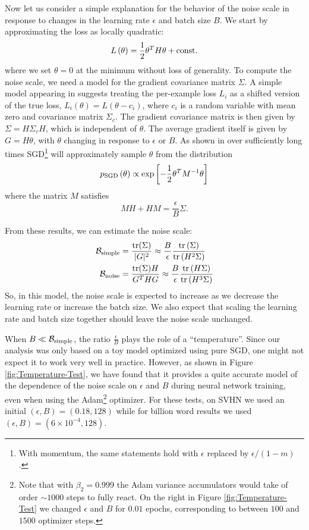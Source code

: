 \documentclass[english]{article}
\newcommand{\CB}{{\cal B}}
\begin{document}
Now let us consider a simple  explanation for the behavior of the noise scale in response to changes in the learning rate $\epsilon$ and batch size $B$.  %
We start by approximating the loss as locally quadratic:
\[
L\left(\theta\right)=\frac{1}{2}\theta^{T}H\theta+{\rm const.}
\]
where we set $\theta=0$ at the minimum without loss of generality. To compute the noise scale, we need a model for the gradient covariance matrix $\Sigma$. A simple model appearing in \cite{conf/icml/SchaulZL13} suggests treating the per-example loss $L_{i}$ as a shifted version of the true loss, $L_{i}\left(\theta\right)=L\left(\theta-c_{i}\right)$, where $c_{i}$ is a random variable with mean zero and covariance matrix $\Sigma_{c}$. The gradient covariance matrix is then given by $\Sigma=H\Sigma_{c}H$, which is independent of $\theta$. The average gradient itself is given by $G=H\theta$, with $\theta$ changing in response to $\epsilon$ or $B$. As shown in \cite{1704.04289} over sufficiently long times SGD\footnote{With momentum, the same statements hold with $\epsilon$ replaced by $\epsilon/\left(1-m\right)$.} will approximately sample $\theta$ from the distribution
\[
p_{{\rm SGD}}\left(\theta\right)\propto\exp\left[-\frac{1}{2}\theta^{T}M^{-1}\theta\right]
\]
where the matrix $M$ satisfies
\[
MH+HM=\frac{\epsilon}{B}\Sigma.
\]


From these results, we can estimate the noise scale:
\begin{align*}
\mathcal{B}_{{\rm simple}} & =\frac{{\rm tr}(\Sigma)}{|G|^{2}}\approx\frac{B}{\epsilon}\frac{{\rm tr}\left(\Sigma\right)}{{\rm tr}\left(H^{2}\Sigma\right)}\\
\mathcal{B}_{{\rm noise}} & =\frac{{\rm tr}(\Sigma) H}{G^{T}HG}\approx\frac{B}{\epsilon}\frac{{\rm tr}\left(H\Sigma\right)}{{\rm tr}\left(H^{3}\Sigma\right)}
\end{align*}
So, in this model, the noise scale is expected to increase as we decrease the learning rate or increase the batch size.   We also expect that scaling the learning rate and batch size together should leave the noise scale unchanged.

When $B \ll \CB_{\rm simple}$, the ratio $\frac{\epsilon}{B}$  plays the role of a ``temperature''.  Since our analysis was only based on a toy model optimized using pure SGD, one might not expect it to work very well in practice.  However, as shown in Figure \ref{fig:Temperature-Test}, we have found that it provides a quite accurate model of the dependence of the noise scale on $\epsilon$ and  $B$ during neural network training, even when using the Adam\footnote{Note that with $\beta_2 = 0.999$ the Adam variance accumulators would take of order $\sim 1000$ steps to fully react.  On the right in Figure \ref{fig:Temperature-Test} we changed $\epsilon$ and $B$ for $0.01$ epochs, corresponding to between  $100$ and $1500$ optimizer steps.} optimizer.  For these tests, on SVHN we used an initial $(\epsilon, B) = (0.18, 128)$ while for billion word results we used $(\epsilon, B) = (6 \times 10^{-4}, 128)$.
\end{document}
